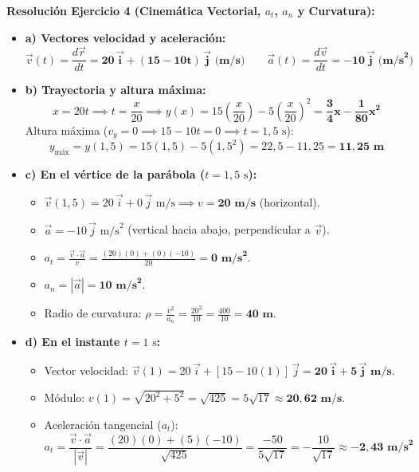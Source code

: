 \documentclass[11pt,a4paper]{article}
\begin{document}
\noindent\textbf{Resolución Ejercicio 4 (Cinemática Vectorial, $a_t$, $a_n$ y Curvatura):}
\begin{itemize}[leftmargin=1.5em, itemsep=3pt]
    \item \textbf{a) Vectores velocidad y aceleración:}
    \[
    \vec{v}(t) = \frac{d\vec{r}}{dt} = \mathbf{20\,\vec{i} + (15 - 10t)\,\vec{j}\text{ (m/s)}} \qquad \vec{a}(t) = \frac{d\vec{v}}{dt} = \mathbf{-10\,\vec{j}\text{ (m/s}^2\text{)}}
    \]
    \item \textbf{b) Trayectoria y altura máxima:}
    \[
    x = 20t \implies t = \frac{x}{20} \implies y(x) = 15\left(\frac{x}{20}\right) - 5\left(\frac{x}{20}\right)^2 = \mathbf{\frac{3}{4}x - \frac{1}{80}x^2}
    \]
    Altura máxima ($v_y = 0 \implies 15 - 10t = 0 \implies t = 1{,}5\text{ s}$):
    \[
    y_{\text{máx}} = y(1{,}5) = 15(1{,}5) - 5(1{,}5^2) = 22{,}5 - 11{,}25 = \mathbf{11{,}25\text{ m}}
    \]
    \item \textbf{c) En el vértice de la parábola ($t = 1{,}5\text{ s}$):}
    \begin{itemize}[leftmargin=1.5em, itemsep=2pt]
        \item $\vec{v}(1{,}5) = 20\,\vec{i} + 0\,\vec{j}\text{ m/s} \implies v = \mathbf{20\text{ m/s}}$ (horizontal).
        \item $\vec{a} = -10\,\vec{j}\text{ m/s}^2$ (vertical hacia abajo, perpendicular a $\vec{v}$).
        \item $a_t = \frac{\vec{v} \cdot \vec{a}}{v} = \frac{(20)(0) + (0)(-10)}{20} = \mathbf{0\text{ m/s}^2}$.
        \item $a_n = |\vec{a}| = \mathbf{10\text{ m/s}^2}$.
        \item Radio de curvatura: $\rho = \frac{v^2}{a_n} = \frac{20^2}{10} = \frac{400}{10} = \mathbf{40\text{ m}}$.
    \end{itemize}
    \item \textbf{d) En el instante $t = 1\text{ s}$:}
    \begin{itemize}[leftmargin=1.5em, itemsep=2pt]
        \item Vector velocidad: $\vec{v}(1) = 20\,\vec{i} + [15 - 10(1)]\,\vec{j} = \mathbf{20\,\vec{i} + 5\,\vec{j}\text{ m/s}}$.
        \item Módulo: $v(1) = \sqrt{20^2 + 5^2} = \sqrt{425} = 5\sqrt{17} \approx \mathbf{20{,}62\text{ m/s}}$.
        \item Aceleración tangencial ($a_t$):
        \[
        a_t = \frac{\vec{v} \cdot \vec{a}}{|\vec{v}|} = \frac{(20)(0) + (5)(-10)}{\sqrt{425}} = \frac{-50}{5\sqrt{17}} = -\frac{10}{\sqrt{17}} \approx \mathbf{-2{,}43\text{ m/s}^2}
\]
\end{itemize}
\end{itemize}
\end{document}
